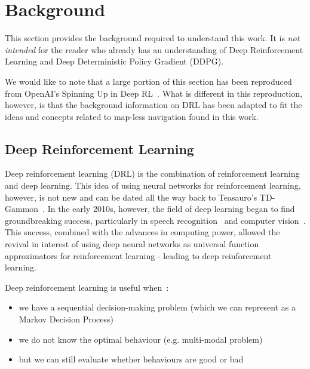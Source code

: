 
\chapter{Background}
\vspace{2em}
This section provides the background required to understand this work. It is \textit{not intended} for the reader who already has an understanding of Deep Reinforcement Learning and Deep Deterministic Policy Gradient (DDPG).

We would like to note that a large portion of this section has been reproduced from OpenAI's Spinning Up in Deep RL~\cite{SpinningUp2018}. What is different in this reproduction, however, is that the background information on DRL has been adapted to fit the ideas and concepts related to map-less navigation found in this work.

\section{Deep Reinforcement Learning}
Deep reinforcement learning (DRL) is the combination of reinforcement learning and deep learning. This idea of using neural networks for reinforcement learning, however, is not new and can be dated all the way back to Teasauro's TD-Gammon~\cite{tesauro_temporal_nodate}. In the early 2010s, however, the field of deep learning began to find groundbreaking success, particularly in speech recognition~\cite{dahl_context-dependent_2012} and computer vision~\cite{krizhevsky_imagenet_2017}. This success, combined with the advances in computing power, allowed the revival in interest of using deep neural networks as universal function approximators for reinforcement learning - leading to deep reinforcement learning.

Deep reinforcement learning is useful when~\cite{SpinningUp2018}:
\begin{itemize}
\item we have a sequential decision-making problem (which we can represent as a Markov Decision Process)
\item we do not know the optimal behaviour (e.g. multi-modal problem)
\item but we can still evaluate whether behaviours are good or bad
\end{itemize}

